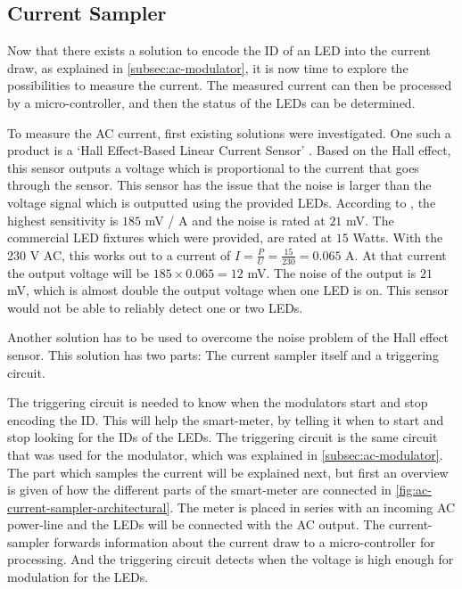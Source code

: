 

\subsection{Current Sampler}


Now that there exists a solution to encode the ID of an LED into the current draw, as explained in \autoref{subsec:ac-modulator}, it is now time to explore the possibilities to measure the current.
The measured current can then be processed by a micro-controller, and then the status of the LEDs can be determined.


To measure the AC current, first existing solutions were investigated.
One such a product is a `Hall Effect-Based Linear Current Sensor' \cite{hall-ac-current-sensor-datasheet}.
Based on the Hall effect, this sensor outputs a voltage which is proportional to the current that goes through the sensor.
This sensor has the issue that the noise is larger than the voltage signal which is outputted using the provided LEDs.
According to \cite{hall-ac-current-sensor-datasheet}, the highest sensitivity is $185$ mV / A and the noise is rated at $21$ mV.
The commercial LED fixtures which were provided, are rated at $15$ Watts.
With the 230 V AC, this works out to a current of $I = \frac{P}{U} = \frac{15}{230} = 0.065$ A.
At that current the output voltage will be $185 \times 0.065 = 12$ mV.
The noise of the output is $21$ mV, which is almost double the output voltage when one LED is on.
This sensor would not be able to reliably detect one or two LEDs.



Another solution has to be used to overcome the noise problem of the Hall effect sensor.
This solution has two parts: The current sampler itself and a triggering circuit.

The triggering circuit is needed to know when the modulators start and stop encoding the ID.
This will help the smart-meter, by telling it when to start and stop looking for the IDs of the LEDs.
The triggering circuit is the same circuit that was used for the modulator, which was explained in \autoref{subsec:ac-modulator}.
The part which samples the current will be explained next, but first an overview is given of how the different parts of the smart-meter are connected in \autoref{fig:ac-current-sampler-architectural}.
The meter is placed in series with an incoming AC power-line and the LEDs will be connected with the AC output.
The current-sampler forwards information about the current draw to a micro-controller for processing.
And the triggering circuit detects when the voltage is high enough for modulation for the LEDs. 


